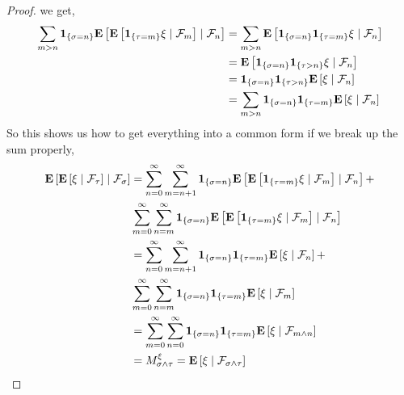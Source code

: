 \documentclass{amsart}
\theoremstyle{remark}
\theoremstyle{definition}
\begin{document}
\begin{proof}
  we get,
\begin{align*}
\sum_{m>n} \characteristic{\lbrace \sigma = n \rbrace}
\cexpectationlong{\mathcal{F}_n}{\cexpectationlong{\mathcal{F}_m}{\characteristic{
    \lbrace \tau = m \rbrace } \xi}} 
&= \sum_{m>n} \cexpectationlong{\mathcal{F}_n}{\characteristic{\lbrace \sigma = n \rbrace}\characteristic{
    \lbrace \tau = m \rbrace } \xi} \\
&= \cexpectationlong{\mathcal{F}_n}{\characteristic{\lbrace \sigma = n \rbrace}\characteristic{
    \lbrace \tau > n \rbrace } \xi} \\
&=\characteristic{\lbrace \sigma = n \rbrace}\characteristic{
    \lbrace \tau > n \rbrace }  \cexpectationlong{\mathcal{F}_n}{\xi} \\
&= \sum_{m>n} \characteristic{\lbrace \sigma = n \rbrace}\characteristic{
    \lbrace \tau=m \rbrace }  \cexpectationlong{\mathcal{F}_n}{\xi} 
\end{align*}
So this shows us how to get everything into a common form if we break
up the sum properly, 
\begin{align*}
\cexpectationlong{\mathcal{F}_\sigma}{\cexpectationlong{\mathcal{F}_\tau}{\xi}} 
&= \sum_{n=0}^\infty \sum_{m=n+1}^\infty \characteristic{\lbrace \sigma = n \rbrace}
\cexpectationlong{\mathcal{F}_n}{\cexpectationlong{\mathcal{F}_m}{\characteristic{
    \lbrace \tau = m \rbrace } \xi}} + \\
&\sum_{m=0}^\infty \sum_{n=m}^\infty \characteristic{\lbrace \sigma = n \rbrace}
\cexpectationlong{\mathcal{F}_n}{\cexpectationlong{\mathcal{F}_m}{\characteristic{
    \lbrace \tau = m \rbrace } \xi}}  \\
&=\sum_{n=0}^\infty \sum_{m=n+1}^\infty \characteristic{\lbrace \sigma = n \rbrace}\characteristic{
    \lbrace \tau=m \rbrace }  \cexpectationlong{\mathcal{F}_n}{\xi} + \\
&\sum_{m=0}^\infty \sum_{n=m}^\infty \characteristic{\lbrace \sigma = n \rbrace}\characteristic{
    \lbrace \tau=m \rbrace }  \cexpectationlong{\mathcal{F}_m}{\xi}
  \\
&= \sum_{m=0}^\infty \sum_{n=0}^\infty \characteristic{\lbrace \sigma = n \rbrace}\characteristic{
    \lbrace \tau=m \rbrace }  \cexpectationlong{\mathcal{F}_{m\wedge
      n}}{\xi} \\
&= M^\xi_{\sigma \wedge \tau} = \cexpectationlong{\mathcal{F}_{\sigma
    \wedge \tau}}{\xi}
\end{align*}
\end{proof}
\end{document}
